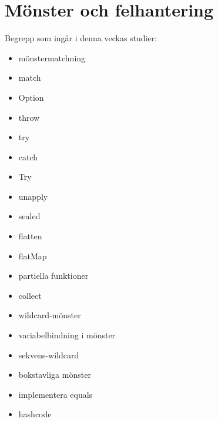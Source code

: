 \chapter{Mönster och felhantering}\label{chapter:W06}
Begrepp som ingår i denna veckas studier:
\begin{itemize}[noitemsep,label={$\square$},leftmargin=*]
\item mönstermatchning
\item match
\item Option
\item throw
\item try
\item catch
\item Try
\item unapply
\item sealed
\item flatten
\item flatMap
\item partiella funktioner
\item collect
\item wildcard-mönster
\item variabelbindning i mönster
\item sekvens-wildcard
\item bokstavliga mönster
\item implementera equals
\item hashcode\end{itemize}
